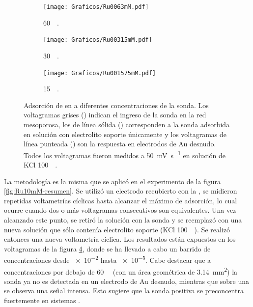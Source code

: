\begin{figure}[b!]
\begin{subfigure}[t]{0.325\textwidth}
			        	\texttt{[image: Graficos/Ru0063mM.pdf]}
			       		\vspace*{-0.40cm}\caption{\aminorutenio\space \SI{60}{\micro\Molar}.}
			         	\label{fig:Ru0063mM}
			     		\end{subfigure}
		     		\begin{subfigure}[t]{0.325\textwidth}
			        	\texttt{[image: Graficos/Ru00315mM.pdf]}
			       		\vspace*{-0.40cm}\caption{\aminorutenio\space \SI{30}{\micro\Molar}.}
			         	\label{fig:Ru00315mM}
			     		\end{subfigure}
		     		\begin{subfigure}[t]{0.325\textwidth}
			        	\texttt{[image: Graficos/Ru001575mM.pdf]}
			       		\vspace*{-0.40cm}\caption{\aminorutenio\space \SI{15}{\micro\Molar}.}
			         	\label{fig:Ru001575mM}
			     		\end{subfigure}	
		 	   	   	\caption[Preconcentración de \aminorutenio\space en \pdmF]{Adsorción de \ru\space en \pdm\space a diferentes concentraciones de la sonda. Los voltagramas grises (\usebox{\gris}) indican el ingreso de la sonda en la red mesoporosa, los de línea sólida (\usebox{\negro}) corresponden a la sonda adsorbida en solución con electrolito soporte únicamente y los voltagramas de línea punteada (\usebox{\punteado}) son la respuesta en electrodos de Au desnudo. Todos los voltagramas fueron medidos a \SI{50}{\milli\volt\per\second} en solución de KCl \SI{100}{\milli\Molar}.}
		     		\label{fig:preconcentraciones}
		      	   	\end{figure} 

		La metodología es la misma que se aplicó en el experimento de la figura \ref{fig:Ru10mM-resumen}. Se utilizó un electrodo recubierto con la \pdmF, se midieron repetidas voltametrías cíclicas hasta alcanzar el máximo de adsorción, lo cual ocurre cuando dos o más voltagramas consecutivos son equivalentes. Una vez alcanzado este punto, se retiró la solución con la sonda y se reemplazó con una nueva solución que sólo contenía electrolito soporte (KCl \SI{100}{\milli\Molar}). Se realizó entonces una nueva voltametría cíclica. Los resultados están expuestos en los voltagramas de la figura \ref{fig:preconcentraciones}, donde se ha llevado a cabo un barrido de concentraciones desde \SI{e-2}{\Molar} hasta \SI{e-5}{\Molar}. Cabe destacar que a concentraciones por debajo de \SI{60}{\micro\Molar} (con un área geométrica de \SI{3.14}{\square\mm}) la sonda ya no es detectada en un electrodo de Au desnudo, mientras que sobre una \pdm\space se observa una señal intensa. Esto sugiere que la sonda positiva se preconcentra fuertemente en sistemas \pdmF.

